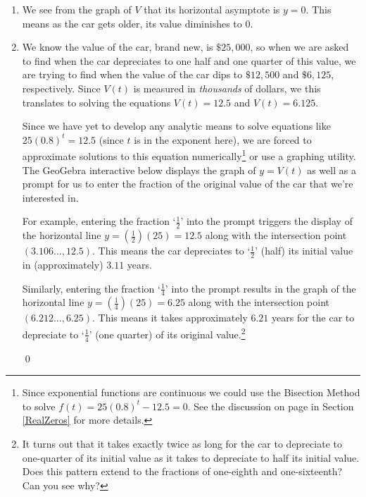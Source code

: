 \documentclass{ximera}
\begin{document}
\begin{example}
\begin{explanation}
\begin{enumerate}
\begin{center}
\end{center}

\item  We see from the graph of $V$ that its horizontal asymptote is $y=0$. This means as the car gets older, its value diminishes to $0$.  

\item We know the value of the car, brand new, is $\$ 25, \! 000$, so when we are asked to find when the car depreciates to one half and one quarter of this value, we are trying to find when the value of the car dips to $\$ 12, \! 500$ and $\$6, \! 125$, respectively.  Since $V(t)$ is measured in \textit{thousands} of dollars, we this translates to solving  the equations $V(t) = 12.5$ and $V(t) = 6.125$.  

 

Since we have yet to develop any analytic means to solve equations like $25(0.8)^t = 12.5$ (since $t$ is in the exponent here), we are forced to approximate solutions to this equation numerically\footnote{Since exponential functions are continuous we could use the Bisection Method to solve $f(t) = 25(0.8)^t - 12.5=0$.  See the discussion on  page \pageref{bisectionmethod} in Section \ref{RealZeros} for more details.} or use a graphing utility.  The GeoGebra interactive below displays the graph of $y = V(t)$ as well as a prompt for us to enter the fraction of the original value of the car that we're interested in.  



\begin{center}
\end{center}

For example, entering the fraction `$\frac{1}{2}$' into the prompt triggers the display of the horizontal line $y = \left( \frac{1}{2} \right) (25) = 12.5$ along with the intersection point $(3.106 \ldots, 12.5)$.   This means the car depreciates to `$\frac{1}{2}$' (half) its initial value in (approximately) $3.11$ years.  

Similarly, entering the fraction `$\frac{1}{4}$' into the prompt results in the graph of the horizontal line $y = \left( \frac{1}{4} \right) (25) = 6.25$ along with the intersection point $(6.212 \ldots, 6.25)$.  This means it takes approximately $6.21$ years for the car to depreciate to `$\frac{1}{4}$' (one quarter) of its original value.\footnote{It turns out that it takes exactly twice as long for the car to depreciate to one-quarter of its initial value as it takes to depreciate to half its initial value.  Does this pattern extend to the fractions of one-eighth and one-sixteenth? Can you see why?}

 
\qed
 
\end{enumerate}
\end{explanation}
\end{example}
\end{document}
